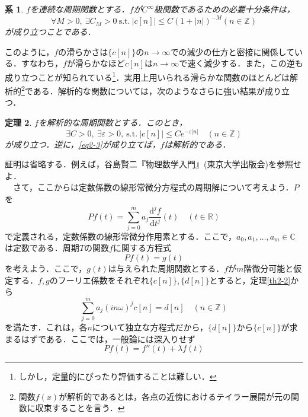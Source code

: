 \documentclass[a4j]{jsbook}
\newtheorem{theorem}{定理}
\newtheorem{cor}[theorem]{系}
\numberwithin{theorem}{chapter}  %
\begin{document}
\begin{cor}
\label{cor2-4}
\(f\)を連続な周期関数とする．\(f\)が\(C^\infty\)級関数であるための必要十分条件は，
\begin{equation*}
    \forall M>0,\ \exists C_M>0\ \mathrm{s.t.}\ |c[n]|\leq C\left(1+|n|\right)^{-M} (n\in\mathbb{Z})
\end{equation*}
が成り立つことである．
\end{cor}
このように，\(f\)の滑らかさは\(\{c[n]\}\)の\(n\to\infty\)での減少の仕方と密接に関係している．すなわち，\(f\)が滑らかなほど\(c[n]\)は\(n\to\infty\)で速く減少する．また，この逆も成り立つことが知られている\footnote{しかし，定量的にぴったり評価することは難しい．}．実用上用いられる滑らかな関数のほとんどは解析的\footnote{関数\(f(x)\)が解析的であるとは，各点の近傍におけるテイラー展開が元の関数に収束することを言う．
}である．解析的な関数については，次のようなさらに強い結果が成り立つ．
\begin{theorem}
\label{th2-5}
\(f\)を解析的な周期関数とする．このとき，
\begin{equation}
    \exists C>0,\ \exists \varepsilon>0,\ \mathrm{s.t.}\ |c[n]|\leq Ce^{-\varepsilon|n|}\quad (n\in\mathbb{Z}) \label{eq2-3}
\end{equation}
が成り立つ．逆に，\eqref{eq2-3}が成り立てば，\(f\)は解析的である．
\end{theorem}
証明は省略する．例えば，谷島賢二『物理数学入門』(東京大学出版会)を参照せよ．\\
　さて，ここからは定数係数の線形常微分方程式の周期解について考えよう．\(P\)を
\begin{equation*}
    Pf(t)=\sum_{j=0}^m a_j\frac{\mathrm{d}^j f}{\mathrm{d}t^j}(t)\quad (t\in\mathbb{R})
\end{equation*}
で定義される，定数係数の線形常微分作用素とする．ここで，\(a_0, a_1, \dots, a_m\in\mathbb{C}\)は定数である．周期\(T\)の関数\(f\)に関する方程式
\begin{equation*}
    Pf(t)=g(t)
\end{equation*}
を考えよう．ここで，\(g(t)\)は与えられた周期関数とする．\(f\)が\(m\)階微分可能と仮定する．\(f, g\)のフーリエ係数をそれぞれ\(\{c[n]\}, \{d[n]\}\)とすると，定理\ref{th2-2}から
\begin{equation*}
    \sum_{j=0}^m a_j(in\omega)^j c[n]=d[n]\quad (n\in\mathbb{Z})
\end{equation*}
を満たす．これは，各\(n\)について独立な方程式だから，\(\{d[n]\}\)から\(\{c[n]\}\)が求まるはずである．ここでは，一般論には深入りせず
\begin{equation*}
    Pf(t)=f''(t)+\lambda f(t)
\end{equation*}
\end{document}
